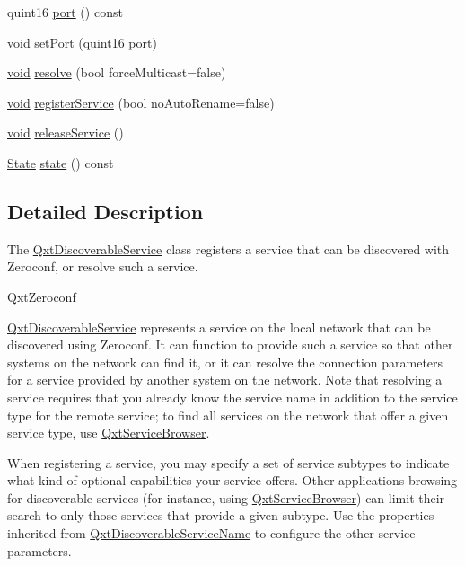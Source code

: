 \begin{DoxyCompactItemize}
\item 
quint16 \hyperlink{class_qxt_discoverable_service_a2e2da5f2c7c97bf541c953088fc7b44e}{port} () const 
\item 
\hyperlink{group___u_a_v_objects_plugin_ga444cf2ff3f0ecbe028adce838d373f5c}{void} \hyperlink{class_qxt_discoverable_service_a6e390f8d51ff5d047976b637629412c9}{set\-Port} (quint16 \hyperlink{classport}{port})
\item 
\hyperlink{group___u_a_v_objects_plugin_ga444cf2ff3f0ecbe028adce838d373f5c}{void} \hyperlink{class_qxt_discoverable_service_ab910ed505996b57cf099497826f6ac65}{resolve} (bool force\-Multicast=false)
\item 
\hyperlink{group___u_a_v_objects_plugin_ga444cf2ff3f0ecbe028adce838d373f5c}{void} \hyperlink{class_qxt_discoverable_service_aa83d9193c724657eaeb52c5536156d51}{register\-Service} (bool no\-Auto\-Rename=false)
\item 
\hyperlink{group___u_a_v_objects_plugin_ga444cf2ff3f0ecbe028adce838d373f5c}{void} \hyperlink{class_qxt_discoverable_service_a31026acc785116b24541d2b03175b0ae}{release\-Service} ()
\item 
\hyperlink{class_qxt_discoverable_service_a2447c7eb207d58a8b338af5d0fd9250a}{State} \hyperlink{class_qxt_discoverable_service_a8aaa3b671e0488538eedc85f940275f1}{state} () const 
\end{DoxyCompactItemize}


\subsection{Detailed Description}
The \hyperlink{class_qxt_discoverable_service}{Qxt\-Discoverable\-Service} class registers a service that can be discovered with Zeroconf, or resolve such a service. 

Qxt\-Zeroconf

\hyperlink{class_qxt_discoverable_service}{Qxt\-Discoverable\-Service} represents a service on the local network that can be discovered using Zeroconf. It can function to provide such a service so that other systems on the network can find it, or it can resolve the connection parameters for a service provided by another system on the network. Note that resolving a service requires that you already know the service name in addition to the service type for the remote service; to find all services on the network that offer a given service type, use \hyperlink{class_qxt_service_browser}{Qxt\-Service\-Browser}.

When registering a service, you may specify a set of service subtypes to indicate what kind of optional capabilities your service offers. Other applications browsing for discoverable services (for instance, using \hyperlink{class_qxt_service_browser}{Qxt\-Service\-Browser}) can limit their search to only those services that provide a given subtype. Use the properties inherited from \hyperlink{class_qxt_discoverable_service_name}{Qxt\-Discoverable\-Service\-Name} to configure the other service parameters.

